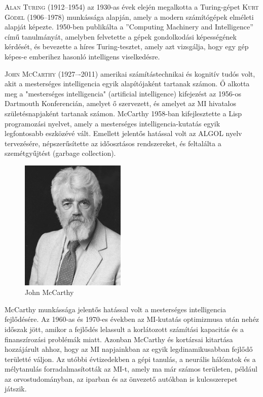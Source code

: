 \documentclass[
]{thesis-ekf}
\theoremstyle{definition}
\theoremstyle{remark}
\begin{document}
\textsc{Alan Turing} (1912--1954) az 1930-as évek elején megalkotta a Turing-gépet \textsc{Kurt Gödel} (1906--1978) munkássága alapján, amely a modern számítógépek elméleti alapját képezte. 1950-ben publikálta a ''Computing Machinery and Intelligence'' című tanulmányát, amelyben felvetette a gépek gondolkodási képességének kérdését, és bevezette a híres Turing-tesztet, amely azt vizsgálja, hogy egy gép képes-e emberihez hasonló intelligens viselkedésre. \cite{AlanTuring,CMI}

\textsc{John McCarthy} (1927–-2011) amerikai számítástechnikai és kognitív tudós volt, akit a mesterséges intelligencia egyik alapítójaként tartanak számon. Ő alkotta meg a "mesterséges intelligencia" (artificial intelligence) kifejezést az 1956-os Dartmouth Konferencián, amelyet ő szervezett, és amelyet az MI hivatalos születésnapjaként tartanak számon. McCarthy 1958-ban kifejlesztette a Lisp programozási nyelvet, amely a mesterséges intelligencia-kutatás egyik legfontosabb eszközévé vált. Emellett jelentős hatással volt az ALGOL nyelv tervezésére, népszerűsítette az időosztásos rendszereket, és feltalálta a szemétgyűjtést (garbage collection). 

\begin{figure}[h!]
	\centering
	\includegraphics[width=5cm]{./pictures/John_McCarthy.png}
	\caption{John McCarthy}
	\label{McCarthy}
\end{figure}

McCarthy munkássága jelentős hatással volt a mesterséges intelligencia fejlődésére. Az 1960-as és 1970-es években az MI-kutatás optimizmusa után nehéz időszak jött, amikor a fejlődés lelassult a korlátozott számítási kapacitás és a finanszírozási problémák miatt. Azonban McCarthy és kortársai kitartása hozzájárult ahhoz, hogy az MI napjainkban az egyik legdinamikusabban fejlődő területté váljon. Az utóbbi évtizedekben a gépi tanulás, a neurális hálózatok és a mélytanulás forradalmasították az MI-t, amely ma már számos területen, például az orvostudományban, az iparban és az önvezető autókban is kulcsszerepet játszik. \cite{JohnMcCarthy}
\end{document}
